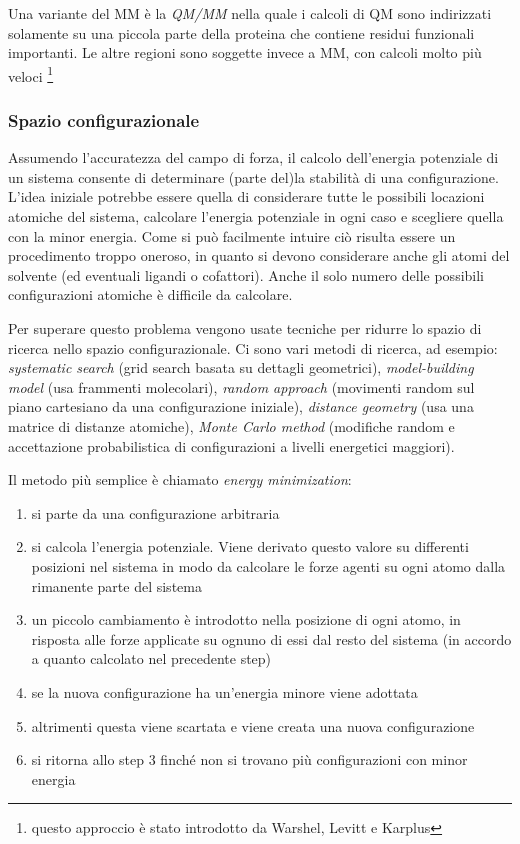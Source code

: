 {\par Una variante del MM è la \textit{QM/MM} nella quale i calcoli di QM sono indirizzati solamente su una piccola parte della proteina che contiene residui funzionali importanti. Le altre regioni sono soggette invece a MM, con calcoli molto più veloci \footnote{questo approccio è stato introdotto da Warshel, Levitt e Karplus}

\subsubsection{Spazio configurazionale}

\par Assumendo l'accuratezza del campo di forza, il calcolo dell'energia potenziale di un sistema consente di determinare (parte del)la stabilità di una configurazione. L'idea iniziale potrebbe essere quella di considerare tutte le possibili locazioni atomiche del sistema, calcolare l'energia potenziale in ogni caso e scegliere quella con la minor energia. Come si può facilmente intuire ciò risulta essere un procedimento troppo oneroso, in quanto si devono considerare anche gli atomi del solvente (ed eventuali ligandi o cofattori). Anche il solo numero delle possibili configurazioni atomiche è difficile da calcolare.

\par Per superare questo problema vengono usate tecniche per ridurre lo spazio di ricerca nello spazio configurazionale. Ci sono vari metodi di ricerca, ad esempio: \textit{systematic search }(grid search basata su dettagli geometrici), \textit{model-building model }(usa frammenti molecolari), \textit{random approach }(movimenti random sul piano cartesiano da una configurazione iniziale), \textit{distance geometry} (usa una matrice di distanze atomiche), \textit{Monte Carlo method} (modifiche random e accettazione probabilistica di configurazioni a livelli energetici maggiori)\supercite{ROY2015151}.

\par Il metodo più semplice è chiamato \textit{energy minimization}:

\begin{enumerate}
	\item si parte da una configurazione arbitraria
	\item si calcola l'energia potenziale. Viene derivato questo valore su differenti posizioni nel sistema in modo da calcolare le forze agenti su ogni atomo dalla rimanente parte del sistema
	\item un piccolo cambiamento è introdotto nella posizione di ogni atomo, in risposta alle forze applicate su ognuno di essi dal resto del sistema (in accordo a quanto calcolato nel precedente step)
	\item se la nuova configurazione ha un'energia minore viene adottata
	\item altrimenti questa viene scartata e viene creata una nuova configurazione
	\item si ritorna allo step 3 finché non si trovano più configurazioni con minor energia
\end{enumerate}

}
